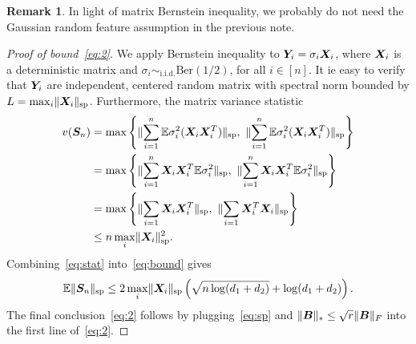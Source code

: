 \documentclass[11pt]{article}
\theoremstyle{plain}
\theoremstyle{definition}
\newtheorem{rmk}{Remark}
\begin{document}
\begin{rmk} In light of matrix Bernstein inequality, we probably do not need the Gaussian random feature assumption in the previous note. 
\end{rmk}
\begin{proof}[Proof of bound~\eqref{eq:2}]
We apply Bernstein inequality to $\bm Y_i=\sigma_i\bm X_i$, where $\bm X_i$ is a deterministic matrix and $\sigma_i\sim_{\text{i.i.d.}}\text{Ber}(1/2)$, for all $i\in[n]$. It ie easy to verify that $\bm Y_i$ are independent, centered random matrix with spectral norm bounded by $L=\max_i \lVert\bm X_i\rVert_\text{sp}$. Furthermore, the matrix variance statistic
\begin{align}\label{eq:stat}
v(\mS_n)&=\max\left\{ \snormSize{}{\sum_{i=1}^n \mathbb{E} \sigma^2_i(\mX_i\mX^T_i)},\ \snormSize{}{\sum_{i=1}^n \mathbb{E}\sigma^2_i(\mX_i\mX^T_i)}\right\} \notag \\
&= \max\left\{\snormSize{}{ \sum_{i=1}^n \mX_i\mX^T_i\mathbb{E}\sigma^2_i},\ \snormSize{}{ \sum_{i=1}^n \mX_i\mX^T_i\mathbb{E}\sigma^2_i}\right\}\notag \\
&=\max\left\{\snormSize{}{\sum_{i=1}\mX_i\mX^T_i},\ \snormSize{}{\sum_{i=1}\mX^T_i\mX_i} \right\}\notag \\
&\leq n\max_i\snormSize{}{\mX_i}^2.
\end{align}
Combining~\eqref{eq:stat} into~\eqref{eq:bound} gives
\begin{equation}\label{eq:sp}
\mathbb{E}\lVert\bm S_n\rVert_\text{sp}\leq 2 \max_i\lVert\bm X_i\rVert_\text{sp}\left(\sqrt{n\log (d_1+d_2)}+\log (d_1+d_2)\right).
\end{equation}
The final conclusion~\eqref{eq:2} follows by plugging~\eqref{eq:sp} and $\lVert\bm B\rVert_*\leq \sqrt{r}\lVert\bm B\rVert_F$ into the first line of~\eqref{eq:2}.
\end{proof}


\end{document}
